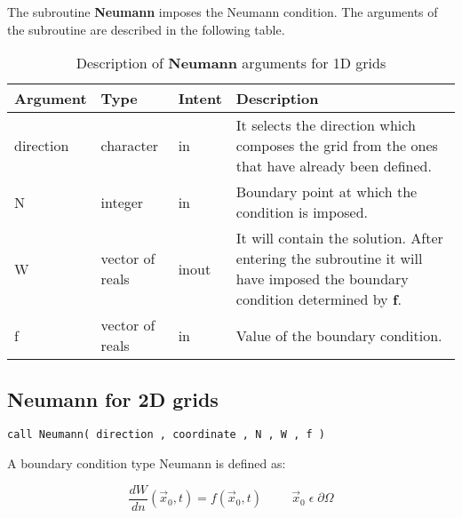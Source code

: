The subroutine \textbf{Neumann} imposes the Neumann condition. The arguments of the subroutine are described in the following table.

\begin{table}[H]
	\begin{center}
		\begin{spacing}{1.2}
			\begin{tabular}{| l | l | l | p{5cm} |}
				
				\hline
				
				\bf Argument & \bf Type & \bf Intent & \bf Description \\ \hline \hline
				
				direction & character & in &   It selects the direction which composes the grid from the ones that have already been defined. \\ \hline
				
				N &  integer & in & Boundary point at which the condition is imposed.\\ \hline
				
				W &  vector of reals & inout & It will contain the solution. After entering the subroutine it will have imposed the boundary condition determined by \textbf{f}.\\ \hline
				
				f & vector of reals & in & Value of the boundary condition.\\ \hline
				
			\end{tabular}
		\end{spacing}
	\end{center}
	\caption{Description of \textbf{Neumann} arguments for 1D grids}
\end{table}

\subsection*{Neumann for 2D grids}

\lstset{language=Fortran}
\begin{lstlisting}[frame=trBL]
call Neumann( direction , coordinate , N , W , f )\end{lstlisting}

A boundary condition type Neumann is defined as:

\begin{equation*}
\frac{dW}{dn}(\vec{x}_{0},t)= f(\vec{x}_{0},t)   \hspace{1cm}   \vec{x}_{0} \; \epsilon \; \partial \Omega
\end{equation*}

